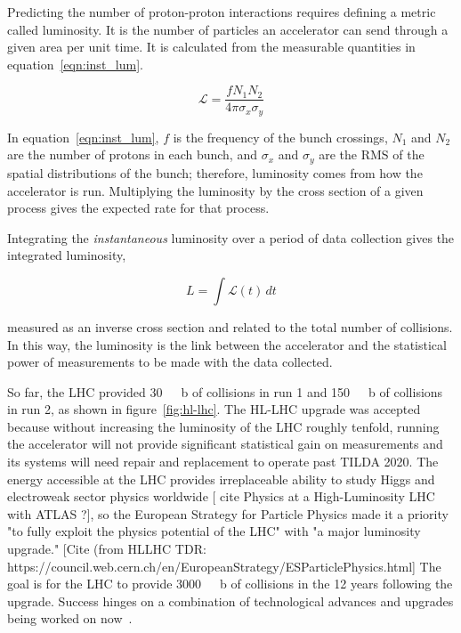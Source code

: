 Predicting the number of proton-proton interactions requires defining a metric called luminosity. It is the number of particles an accelerator can send through a given area per unit time. It is calculated from the measurable quantities in equation~\ref{eqn:inst_lum}.

\begin{equation}
\mathcal{L} = \frac{f N_{1} N_{2} }{4 \pi \sigma_{x} \sigma_{y}}
\label{eqn:inst_lum}
\end{equation}

In equation~\ref{eqn:inst_lum}, $f$ is the frequency of the bunch crossings, $N_{1}$ and $N_{2}$ are the number of protons in each bunch, and $\sigma_{x}$ and $\sigma_{y}$ are the RMS of the spatial distributions of the bunch; therefore, luminosity comes from how the accelerator is run. Multiplying the luminosity by the cross section of a given process gives the expected rate for that process.

Integrating the \textit{instantaneous} luminosity over a period of data collection gives the integrated luminosity,

\begin{equation}
L = \int \mathcal{L} \left( t \right) \,dt
\label{eqn:int_lum}
\end{equation}

measured as an inverse cross section and related to the total number of collisions. In this way, the luminosity is the link between the accelerator and the statistical power of measurements to be made with the data collected. 

So far, the LHC provided \SI{30}{\per\fempto\barn} of collisions in run 1 and \SI{150}{\per\fempto\barn} of collisions in run 2, as shown in figure~\ref{fig:hl-lhc}. The HL-LHC upgrade was accepted because without increasing the luminosity of the LHC roughly tenfold, running the accelerator will not provide significant statistical gain on measurements and its systems will need repair and replacement to operate past TILDA 2020. The energy accessible at the LHC provides irreplaceable ability to study Higgs and electroweak sector physics worldwide [ cite Physics at a High-Luminosity LHC with ATLAS ?], so the European Strategy for Particle Physics made it a priority "to fully exploit the physics potential of the LHC" with "a major luminosity upgrade." [Cite (from HLLHC TDR: https://council.web.cern.ch/en/EuropeanStrategy/ESParticlePhysics.html] The goal is for the LHC to provide \SI{3000}{\per\fempto\barn} of collisions in the 12 years following the upgrade. Success hinges on a combination of technological advances and upgrades being worked on now~\cite{hl_lhc_tdr}.


